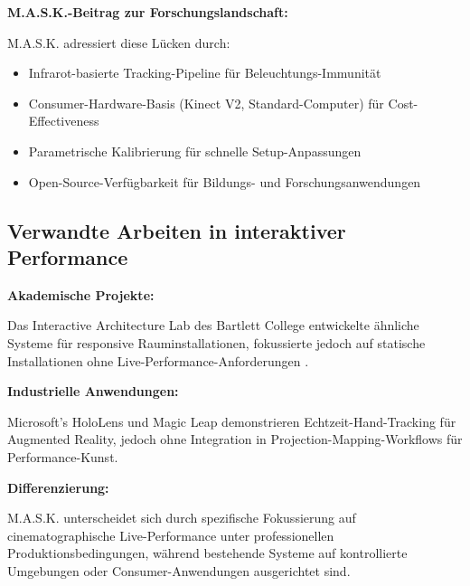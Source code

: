 \textbf{M.A.S.K.-Beitrag zur Forschungslandschaft:}

M.A.S.K. adressiert diese Lücken durch:
\begin{itemize}
    \item Infrarot-basierte Tracking-Pipeline für Beleuchtungs-Immunität
    \item Consumer-Hardware-Basis (Kinect V2, Standard-Computer) für Cost-Effectiveness
    \item Parametrische Kalibrierung für schnelle Setup-Anpassungen
    \item Open-Source-Verfügbarkeit für Bildungs- und Forschungsanwendungen
\end{itemize}

\subsection{Verwandte Arbeiten in interaktiver Performance}

\textbf{Akademische Projekte:}

\raggedright Das Interactive Architecture Lab des Bartlett College entwickelte ähnliche Systeme für responsive Rauminstallationen, fokussierte jedoch auf statische Installationen ohne Live-Performance-Anforderungen \cite{achten2011interactive}.

\textbf{Industrielle Anwendungen:}

\raggedright Microsoft's HoloLens und Magic Leap demonstrieren Echtzeit-Hand-Tracking für Augmented Reality, jedoch ohne Integration in Projection-Mapping-Workflows für Performance-Kunst.

\textbf{Differenzierung:}

\raggedright M.A.S.K. unterscheidet sich durch spezifische Fokussierung auf cinematographische Live-Performance unter professionellen Produktionsbedingungen, während bestehende Systeme auf kontrollierte Umgebungen oder Consumer-Anwendungen ausgerichtet sind.